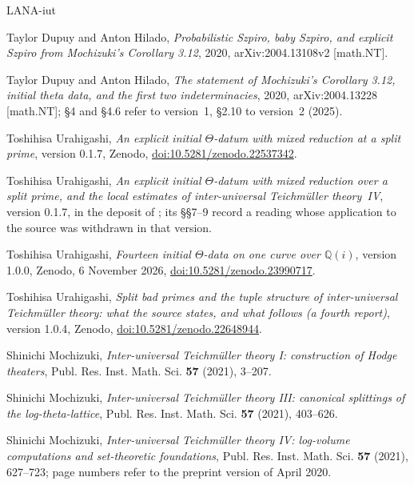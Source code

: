 \documentclass[11pt]{amsart}
\theoremstyle{remark}
\begin{document}
\begin{thebibliography}{LANA-iut}

Taylor Dupuy and Anton Hilado, \emph{Probabilistic {S}zpiro, baby {S}zpiro, and explicit {S}zpiro from {M}ochizuki's
  {C}orollary 3.12}, 2020, arXiv:2004.13108v2 [math.NT].

Taylor Dupuy and Anton Hilado, \emph{The statement of {M}ochizuki's {C}orollary 3.12, initial theta data, and the
  first two indeterminacies}, 2020, arXiv:2004.13228 [math.NT]; \S4 and \S4.6 refer to version~1, \S2.10 to
  version~2 (2025).

Toshihisa Urahigashi, \emph{An explicit initial $\Theta$-datum with mixed reduction at a split prime}, version
  0.1.7, Zenodo, \href{https://doi.org/10.5281/zenodo.22537342}{doi:10.5281/zenodo.22537342}.

Toshihisa Urahigashi, \emph{An explicit initial $\Theta$-datum with mixed reduction over a split prime, and the local
  estimates of inter-universal {T}eichm\"uller theory~{IV}}, version 0.1.7, in the deposit of \cite{First}; its
  \S\S7--9 record a reading whose application to the source was withdrawn in that version.

Toshihisa Urahigashi, \emph{Fourteen initial $\Theta$-data on one curve over $\mathbb{Q}(i)$}, version 1.0.0, Zenodo,
  6 November 2026, \href{https://doi.org/10.5281/zenodo.23990717}{doi:10.5281/zenodo.23990717}.

Toshihisa Urahigashi, \emph{Split bad primes and the tuple structure of inter-universal {T}eichm\"uller theory:
  what the source states, and what follows (a fourth report)}, version 1.0.4, Zenodo,
  \href{https://doi.org/10.5281/zenodo.22648944}{doi:10.5281/zenodo.22648944}.

Shinichi Mochizuki, \emph{Inter-universal {T}eichm\"uller theory {I}: construction of {H}odge theaters}, Publ. Res.
  Inst. Math. Sci. \textbf{57} (2021), 3--207.

Shinichi Mochizuki, \emph{Inter-universal {T}eichm\"uller theory {III}: canonical splittings of the
  log-theta-lattice}, Publ. Res. Inst. Math. Sci. \textbf{57} (2021), 403--626.

Shinichi Mochizuki, \emph{Inter-universal {T}eichm\"uller theory {IV}: log-volume computations and set-theoretic
  foundations}, Publ. Res. Inst. Math. Sci. \textbf{57} (2021), 627--723; page numbers refer to the preprint
  version of April 2020.


\end{thebibliography}
\end{document}
